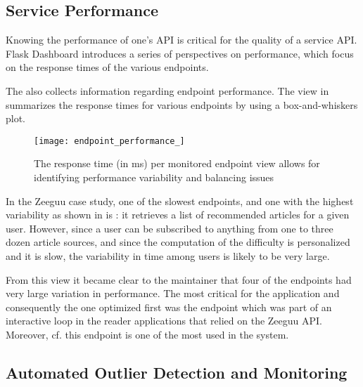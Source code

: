 
\subsection{Service Performance}
\label{sec:perf}

Knowing the performance of one’s API is critical for the quality of a service API. Flask Dashboard introduces a series of perspectives on performance, which focus on the response times of the various endpoints.





The \tool also collects information regarding endpoint performance. The view in  summarizes the response times for various endpoints by using a box-and-whiskers plot. 


 \begin{figure}[!ht]
   \centering
   \texttt{[image: endpoint\_performance\_]}
   \caption{The response time (in ms) per monitored endpoint view allows for identifying performance variability and balancing issues}
   \label{fig:ep}
 \end{figure}



In the Zeeguu case study, one of the slowest endpoints, and one with the highest variability as shown in  is \epFeedItems: it retrieves a list of recommended articles for a given user. However, since a user can be subscribed to anything from one to three dozen article sources, and since the computation of the difficulty is personalized and it is slow, the variability in time among users is likely to be very large. 

  From this view it became clear to the maintainer that four of the endpoints had very large variation in performance.   The most critical for the application and consequently the one optimized first was the \epTranslations endpoint which was part of an interactive loop in the reader applications that relied on the Zeeguu API. Moreover, cf.  this endpoint is one of the most used in the system.



  \subsection{Automated Outlier Detection and Monitoring}
  
